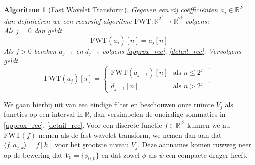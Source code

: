 \documentclass[11pt]{uvamath}
\newcommand{\R}{\mathbb{R}}
\theoremstyle{plain}
\newtheorem*{algo}{Algoritme}
\theoremstyle{definition}
\theoremstyle{remark}
\newcommand{\inpr}[2]{\langle #1 , #2 \rangle}
\begin{document}
\begin{algo}[Fast Wavelet Transform]
  Gegeven een rij co\"effici\"enten $a_j\in\R^{2^j}$ dan definie\"eren we een recursief
  algoritme $\mathrm{FWT}:\R^{2^j}\to\R^{2^j}$ volgens:\\
  Als $j=0$ dan geldt
  \[
  \mathrm{FWT}(a_j)[n] = a_j[n]
  \]
  Als $j>0$ bereken $a_{j-1}$ en $d_{j-1}$ volgens \ref{approx_rec}, \ref{detail_rec}.
  Vervolgens geldt
  \begin{equation}
    \label{FWT_cases}
    \mathrm{FWT}(a_j)[n] = \begin{cases}
      \mathrm{FWT}(a_{j-1})[n] & \text{als } n\leq 2^{j-1} \\
      d_{j-1}[n] & \text{als } n>2^{j-1} \end{cases}
  \end{equation}
\end{algo}
We gaan hierbij uit van een eindige filter en beschouwen onze ruimte $V_j$ als functies
op een interval in $\R$, dan versimpelen de oneindige sommaties in \ref{approx_rec},
\ref{detail_rec}. Voor een discrete functie $f\in\R^{2^j}$ kunnen we nu
$\mathrm{FWT}(f)$ nemen als de fast wavelet transform,
we nemen dan aan dat $\inpr{f}{a_{j,k}} = f[k]$ voor het
grootste niveau $V_j$. Deze aannames komen ruwweg neer op de bewering dat
$V_0 = \{\phi_{0,0}\}$ en dat zowel $\phi$ als $\psi$ een compacte drager heeft.
\end{document}
